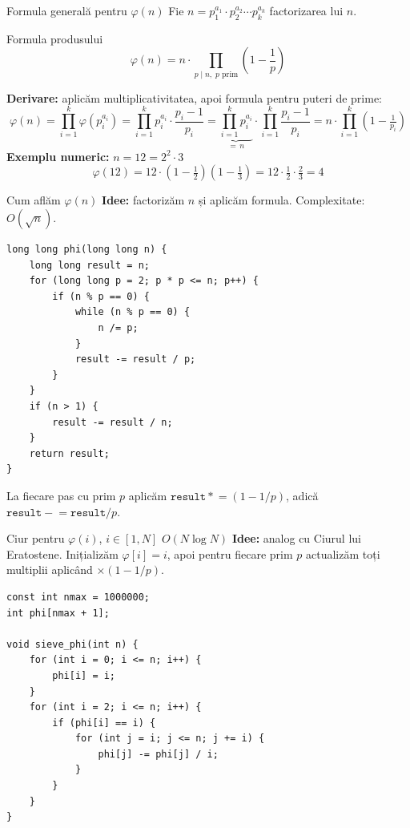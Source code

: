 \documentclass[10pt]{beamer}
\begin{document}
\begin{frame}{Formula generală pentru $\varphi(n)$}
  Fie $n = p_1^{a_1} \cdot p_2^{a_2} \cdots p_k^{a_k}$ factorizarea lui $n$.
  \begin{block}{Formula produsului}
    \[
      \varphi(n) = n \cdot \prod_{p \mid n,\; p \text{ prim}} \!\!\left(1 - \frac{1}{p}\right)
    \]
  \end{block}
  \smallskip
  \textbf{Derivare:} aplicăm multiplicativitatea, apoi formula pentru puteri de prime:
  \[
    \varphi(n)
    = \prod_{i=1}^k \varphi(p_i^{a_i})
    = \prod_{i=1}^k p_i^{a_i} \cdot \frac{p_i-1}{p_i}
    = \underbrace{\prod_{i=1}^k p_i^{a_i}}_{=\,n}
      \cdot \prod_{i=1}^k \frac{p_i-1}{p_i}
    = n \cdot \prod_{i=1}^k \!\left(1 - \tfrac{1}{p_i}\right)
  \]
  \smallskip
  \textbf{Exemplu numeric:} $n = 12 = 2^2 \cdot 3$
  \[
    \varphi(12) = 12 \cdot \left(1 - \tfrac{1}{2}\right)\!\left(1 - \tfrac{1}{3}\right)
    = 12 \cdot \tfrac{1}{2} \cdot \tfrac{2}{3} = 4
  \]
\end{frame}

\begin{frame}[fragile]{Cum aflăm $\varphi(n)$}
  \textbf{Idee:} factorizăm $n$ și aplicăm formula. Complexitate: $O(\sqrt{n})$.
  \begin{lstlisting}
long long phi(long long n) {
    long long result = n;
    for (long long p = 2; p * p <= n; p++) {
        if (n % p == 0) {
            while (n % p == 0) {
                n /= p;
            }
            result -= result / p;
        }
    }
    if (n > 1) {
        result -= result / n;
    }
    return result;
}
  \end{lstlisting}
  La fiecare pas cu prim $p$ aplicăm $\mathtt{result} \mathrel{*}= (1 - 1/p)$,
  adică $\mathtt{result} \mathrel{-}= \mathtt{result}/p$.
\end{frame}

\begin{frame}[fragile]{Ciur pentru $\varphi(i)$, $i \in [1, N]$ \textemdash{} $O(N \log N)$}
  \textbf{Idee:} analog cu Ciurul lui Eratostene. Inițializăm $\varphi[i] = i$,
  apoi pentru fiecare prim $p$ actualizăm toți multiplii aplicând $\times(1-1/p)$.
  \begin{lstlisting}
const int nmax = 1000000;
int phi[nmax + 1];

void sieve_phi(int n) {
    for (int i = 0; i <= n; i++) {
        phi[i] = i;
    }
    for (int i = 2; i <= n; i++) {
        if (phi[i] == i) {
            for (int j = i; j <= n; j += i) {
                phi[j] -= phi[j] / i;
            }
        }
    }
}
  \end{lstlisting}
\end{frame}
\end{document}
